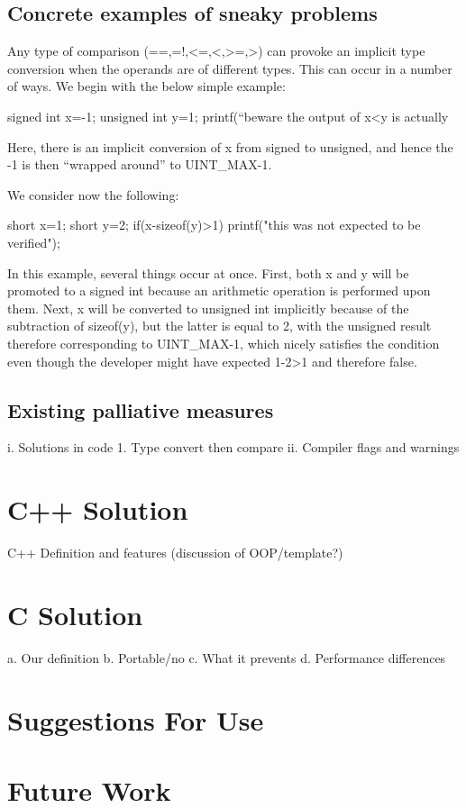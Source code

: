 \documentclass[11pt,letterpaper]{article}
\begin{document}
\subsection{Concrete examples of sneaky problems}
\Blindtext[3]
Any type of comparison (==,=!,<=,<,>=,>) can provoke an implicit type conversion when the operands are of different types. This can occur in a number of ways. We begin with the below simple example:

signed int x=-1;
unsigned int y=1;
printf(“beware the output of x<y is actually %

Here, there is an implicit conversion of x from signed to unsigned, and hence the -1 is then “wrapped around” to UINT_MAX-1. 

We consider now the following:

short x=1;
short y=2;
if(x-sizeof(y)>1){
  		printf("this was not expected to be verified");}	

In this example, several things occur at once. First, both x and y will be promoted to a signed int because an arithmetic operation is performed upon them. Next, x will be converted to unsigned int implicitly because of the subtraction of sizeof(y), but the latter is equal to 2, with the unsigned result therefore corresponding to UINT_MAX-1, which nicely satisfies the condition even though the developer might have expected 1-2>1 and therefore false.

\subsection{Existing palliative measures}
\Blindtext[4]

i.	Solutions in code
1.	Type convert then compare
ii.	Compiler flags and warnings

\section{C++ Solution}
\label{sec:cppimplementation}

C++ Definition and features (discussion of OOP/template?)

\blindtext
{}
\Blindtext[5]


\section{C Solution}
\label{sec:cimplementation}
a.	Our definition
b.	Portable/no
c.	What it prevents
d.	Performance differences

\section{Suggestions For Use}
\label{sec:suggestions}

\section{Future Work}
\label{sec:futurework}



\printindex
\end{document}
